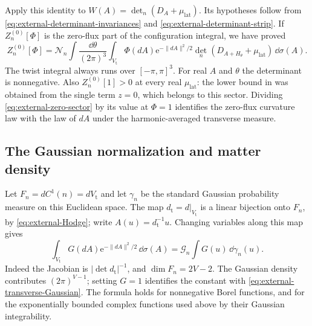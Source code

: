 Apply this identity to
$W(A)=\det_n(D_A+\mu_{\mathrm{lat}})$. Its hypotheses
follow from \eqref{eq:external-determinant-invariances}
and \eqref{eq:external-determinant-strip}. If
$Z_n^{(0)}[\Phi]$ is the zero-flux part of the
configuration integral, we have proved
\begin{equation}\label{eq:external-zero-sector}
 Z_n^{(0)}[\Phi]=\mathcal N_n
       \int\frac{\dd\theta}{(2\pi)^3}
       \int_{V_{\mathrm t}}\Phi(dA)\mathrm e^{-\|dA\|^2/2}
          \det_n(D_{A+H_\theta}+\mu_{\mathrm{lat}})\,\dd\sigma(A).
\end{equation}
The twist integral always runs over $[-\pi,\pi]^3$.
For real $A$ and $\theta$ the determinant is
nonnegative. Also $Z_n^{(0)}[1]>0$ at every real
$\mu_{\mathrm{lat}}$: the lower bound in
\cite[Proposition~2.3]{ChamberLattice} was obtained
from the single term $z=0$, which belongs to this
sector. Dividing \eqref{eq:external-zero-sector}
by its value at $\Phi=1$ identifies the zero-flux
curvature law with the law of $dA$ under the
harmonic-averaged transverse measure.

\subsection{The Gaussian normalization and matter density}
\label{subsec:external-Gaussian-law}

Let $F_n=dC^1(n)=dV_{\mathrm t}$ and let $\gamma_n$
be the standard Gaussian probability measure on this
Euclidean space. The map $d_{\mathrm t}=d|_{V_{\mathrm t}}$
is a linear bijection onto $F_n$, by
\eqref{eq:external-Hodge}; write $A(u)=d_{\mathrm t}^{-1}u$.
Changing variables along this map gives
\begin{equation}\label{eq:external-Gaussian-change}
 \int_{V_{\mathrm t}}G(dA)\mathrm e^{-\|dA\|^2/2}\,\dd\sigma(A)
                     =\mathcal G_n\int G(u)\,\dd\gamma_n(u).
\end{equation}
Indeed the Jacobian is $|\det d_{\mathrm t}|^{-1}$,
and $\dim F_n=2V-2$. The Gaussian density contributes
$(2\pi)^{V-1}$; setting $G=1$ identifies the constant
with \eqref{eq:external-transverse-Gaussian}.
The formula holds for nonnegative Borel functions,
and for the exponentially bounded complex functions
used above by their Gaussian integrability.

